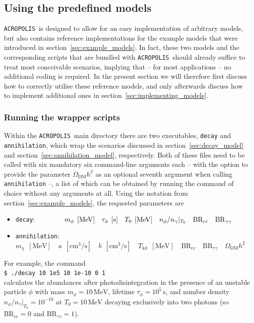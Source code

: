 \documentclass[11pt,a4paper]{article}
\newcommand{\cmd}[1]{\vspace{0.3cm}\texttt{\$ #1}\\[0.3cm]}
\newcommand{\acropolis}{\texttt{ACROPOLIS}~}
\begin{document}
\subsection{Using the predefined models}
\acropolis is designed to allow for an easy implementation of arbitrary models, but also contains reference implementations for the example models that were introduced in section~\ref{sec:example_models}. In fact, these two models and the corresponding scripts that are bundled with \acropolis should already suffice to treat most conceivable scenarios, implying that -- for most applications -- no additional coding is required. In the present section we will therefore first discuss how to correctly utilise these reference models, and only afterwards discuss how to implement additional ones in section~\ref{sec:implementing_models}.

\subsubsection{Running the wrapper scripts}
\label{sec:wrappers}
Within the \acropolis main directory there are two executables, \texttt{decay} and \texttt{annihilation}, which wrap the scenarios discussed in section~\ref{sec:decay_model} and section~\ref{sec:annihilation_model}, respectively. Both of these files need to be called with six mandatory six command-line arguments each -- with the option to provide the parameter $\Omega_\text{DM} h^2$ as an optional seventh argument when calling \texttt{annihilation} --, a list of which can be obtained by running the command of choice without any arguments at all. Using the notation from section~\ref{sec:example_models}, the requested parameters are
\begin{itemize}
	\item \texttt{decay}: $\hspace{1.4cm} m_\phi\;\,[\mathrm{MeV}] \quad \tau_\phi\;\,[\mathrm{s}] \quad T_0\;\,[\mathrm{MeV}] \quad n_\phi/n_\gamma|_{T_0} \quad \text{BR}_{ee} \quad \text{BR}_{\gamma\gamma}$
	\item \texttt{annihilation}: $ m_\chi\;\,[\mathrm{MeV}] \quad a\;\,[\mathrm{cm^3/s}] \quad b\;\,[\mathrm{cm^3/s}] \quad T_\text{kd}\;\,[\mathrm{MeV}] \quad \text{BR}_{ee} \quad \text{BR}_{\gamma\gamma} \quad \Omega_\text{DM} h^2$
\end{itemize}
For example, the command\\[4mm]
\cmd{./decay 10 1e5 10 1e-10 0 1}
calculates the abundances after photodisintegration in the presence of an unstable particle $\phi$ with mass $m_\phi=10\,\mathrm{MeV}$, lifetime $\tau_\phi=10^5\,\mathrm{s}$, and number density $ n_\phi/n_\gamma|_{T_0} = 10^{-10}$ at $T_0=10\,\mathrm{MeV}$ decaying exclusively into two photons (so $\text{BR}_{ee} = 0$ and $\text{BR}_{\gamma\gamma}=1$).
\end{document}
